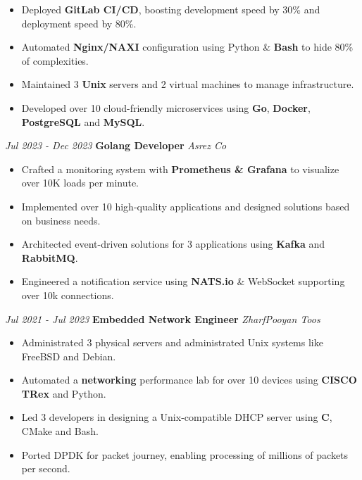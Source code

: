 \documentclass{engineercv}
\begin{document}
\begin{itemize}
  \item Deployed \textbf{GitLab CI/CD}, boosting development speed by 30\% and deployment speed by 80\%.
  \item Automated \textbf{Nginx/NAXI} configuration using Python \& \textbf{Bash} to hide 80\% of complexities.
  \item Maintained 3 \textbf{Unix} servers and 2 virtual machines to manage infrastructure.
  \item Developed over 10 cloud-friendly microservices using \textbf{Go}, \textbf{Docker}, \textbf{PostgreSQL} and \textbf{MySQL}.
\end{itemize}

\begin{twocolentry}{\textit{Jul 2023 - Dec 2023}}
  \textbf{Golang Developer}
  \textit{Asrez Co}
\end{twocolentry}

\begin{itemize}
  \item Crafted a monitoring system with \textbf{Prometheus \& Grafana} to visualize over 10K loads per minute.
  \item Implemented over 10 high-quality applications and designed solutions based on business needs.
  \item Architected event-driven solutions for 3 applications using \textbf{Kafka} and \textbf{RabbitMQ}.
  \item Engineered a notification service using \textbf{NATS.io} \& WebSocket supporting over 10k connections.
\end{itemize}

\begin{twocolentry}{\textit{Jul 2021 - Jul 2023}}
  \textbf{Embedded Network Engineer}
  \textit{ZharfPooyan Toos}
\end{twocolentry}

\begin{itemize}
  \item Administrated 3 physical servers and administrated Unix systems like FreeBSD and Debian.
  \item Automated a \textbf{networking} performance lab for over 10 devices using \textbf{CISCO TRex} and Python.
  \item Led 3 developers in designing a Unix-compatible DHCP server using \textbf{C}, CMake and Bash.
  \item Ported DPDK for packet journey, enabling processing of millions of packets per second.
\end{itemize}
\end{document}
